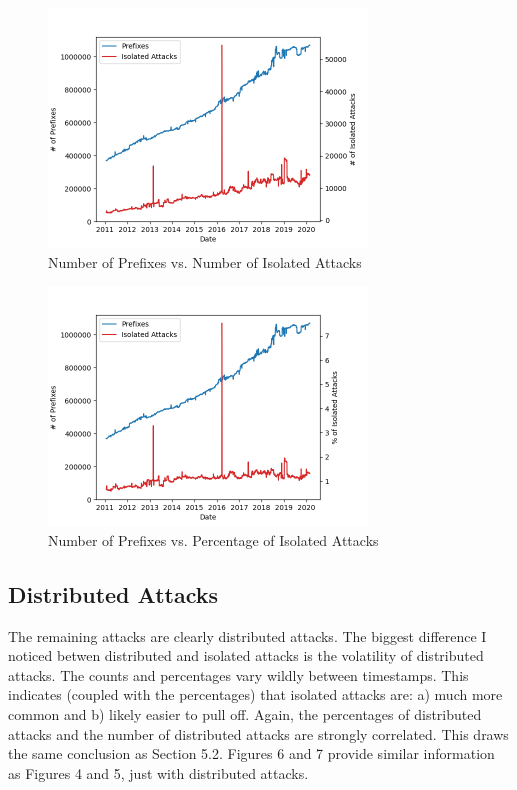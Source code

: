 \begin{figure}[tp]
    \begin{center}
        \includegraphics[width=\textwidth, height=2.5in,
        keepaspectratio]{figures/isolated-and-unique-prefixes.png}
    \end{center}
    \caption{Number of Prefixes vs. Number of Isolated Attacks}
\end{figure}

\begin{figure}[tp]
    \begin{center}
        \includegraphics[width=\textwidth, height=2.5in,
        keepaspectratio]{figures/isolated-percs-and-unique-prefixes.png}
    \end{center}
    \caption{Number of Prefixes vs. Percentage of Isolated Attacks}
\end{figure}

\subsection{Distributed Attacks}
The remaining attacks are clearly distributed attacks. The biggest difference I
noticed betwen distributed and isolated attacks is the volatility of distributed
attacks. The counts and percentages vary wildly between timestamps. This
indicates (coupled with the percentages) that isolated attacks are: a) much more
common and b) likely easier to pull off. Again, the percentages of distributed
attacks and the number of distributed attacks are strongly correlated. This
draws the same conclusion as Section 5.2. Figures 6 and 7 provide similar
information as Figures 4 and 5, just with distributed attacks.

